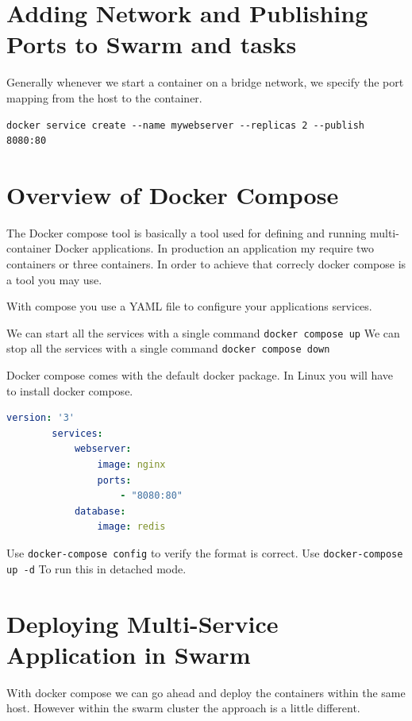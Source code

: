 \documentclass[11pt]{book}
\begin{document}
    \section{Adding Network and Publishing Ports to Swarm and tasks}
    Generally whenever we start a container on a bridge network, we specify the port mapping from the host to the container.


    \begin{lstlisting}[style=terminal]
        docker service create --name mywebserver --replicas 2 --publish 8080:80
    \end{lstlisting}

    \section{Overview of Docker Compose}
    The Docker compose tool is basically a tool used for defining and running multi-container Docker applications.
    In production an application my require two containers or three containers.
    In order to achieve that correcly docker compose is a tool you may use.

    With compose you use a YAML file to configure your applications services.

    We can start all the services with a single command \texttt{docker compose up}
    We can stop all the services with a single command \texttt{docker compose down}

    Docker compose comes with the default docker package. In Linux you will have to install docker compose.

    \begin{lstlisting}[language=yaml,caption={Configuration file},label={lst:config}]
        version: '3'
        services:
            webserver:
                image: nginx
                ports:
                    - "8080:80"
            database:
                image: redis
    \end{lstlisting}

    Use \texttt{docker-compose config} to verify the format is correct.
    Use \texttt{docker-compose up -d} To run this in detached mode.

    \section{Deploying Multi-Service Application in Swarm}
    With docker compose we can go ahead and deploy the containers within the same host.
    However within the swarm cluster the approach is a little different.
\end{document}

